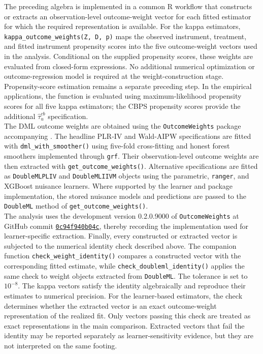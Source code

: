 \documentclass[12pt, a4paper, oneside]{article}
\theoremstyle{plain}
\theoremstyle{definition}
\begin{document}
\begin{sloppypar}

The preceding algebra is implemented in a common R workflow that constructs or
extracts an observation-level outcome-weight vector for each fitted estimator
for which the required representation is available. For the kappa estimators,
\texttt{kappa\_outcome\_weights(Z, D, p)} maps the observed instrument,
treatment, and fitted instrument propensity scores into the five
outcome-weight vectors used in the analysis. Conditional on the supplied
propensity scores, these weights are evaluated from closed-form expressions. No additional numerical optimization or outcome-regression model is required
at the weight-construction stage. Propensity-score estimation remains a
separate preceding step. In the empirical applications, the function is
evaluated using maximum-likelihood propensity scores for all five kappa
estimators; the CBPS propensity scores provide the additional
\(\widehat\tau_u^{cb}\) specification.\\
The DML outcome weights are obtained using the \texttt{OutcomeWeights} package
accompanying \citet{knaus2024treatment}. The headline PLR-IV and Wald-AIPW
specifications are fitted with \texttt{dml\_with\_smoother()} using five-fold
cross-fitting and honest forest smoothers implemented through \texttt{grf}.
Their observation-level outcome weights are then extracted with
\texttt{get\_outcome\_weights()}. Alternative specifications are fitted as
\texttt{DoubleMLPLIV} and \texttt{DoubleMLIIVM} objects using the parametric,
\texttt{ranger}, and XGBoost nuisance learners. Where supported by the learner and package implementation,
the stored nuisance models and predictions are passed to the
\texttt{DoubleML} method of \texttt{get\_outcome\_weights()}.\\
The analysis uses the development
version 0.2.0.9000 of \texttt{OutcomeWeights} at GitHub commit
\href{https://github.com/MCKnaus/OutcomeWeights/commit/0c94f940b04c14d0247b46842af37752e306b79e}{\texttt{0c94f940b04c}}, thereby
recording the implementation used for learner-specific extraction.
Finally, every constructed or extracted vector is subjected to the numerical
identity check described above. The companion function
\texttt{check\_weight\_identity()} compares a constructed vector with the corresponding fitted estimate, while
\texttt{check\_doubleml\_identity()} applies the same check to weight objects
extracted from \texttt{DoubleML}. The tolerance is set to \(10^{-8}\). The
kappa vectors satisfy the identity algebraically and reproduce their estimates
to numerical precision. For the learner-based estimators, the check determines
whether the extracted vector is an exact outcome-weight representation of the
realized fit. Only vectors passing this check are treated as exact
representations in the main comparison. Extracted vectors that fail the
identity may be reported separately as learner-sensitivity evidence, but they
are not interpreted on the same footing.
\end{sloppypar}
\newpage
\end{document}
